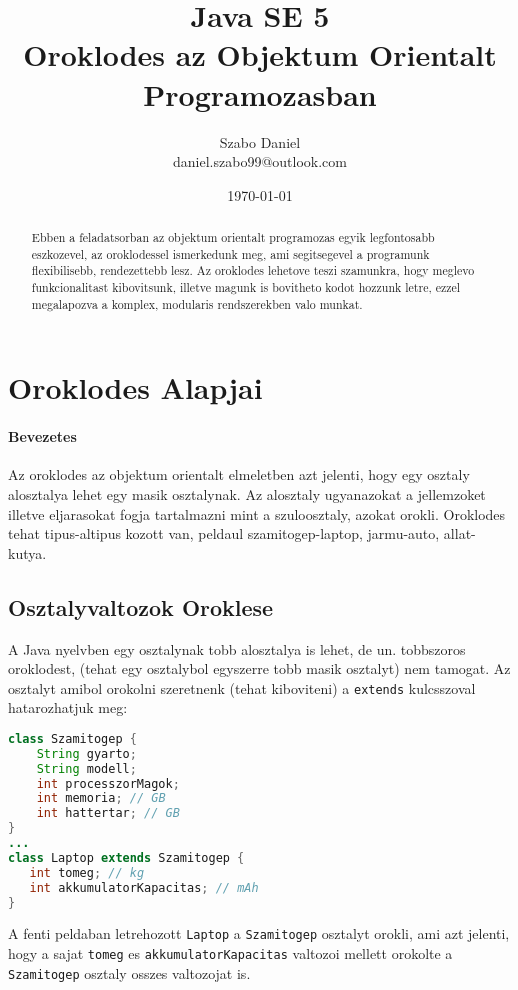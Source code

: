 \documentclass{article}
\title{%
Java SE 5 \\
\large Oroklodes az Objektum Orientalt Programozasban}
\author{Szabo Daniel\\daniel.szabo99@outlook.com}
\date{\today}
\let\l\lstinline
\begin{document}
\maketitle
\begin{abstract}
Ebben a feladatsorban az objektum orientalt programozas egyik legfontosabb eszkozevel, az oroklodessel ismerkedunk meg, ami segitsegevel a programunk flexibilisebb, rendezettebb lesz.
Az oroklodes lehetove teszi szamunkra, hogy meglevo funkcionalitast kibovitsunk, illetve magunk is bovitheto kodot hozzunk letre, ezzel megalapozva a komplex, modularis rendszerekben valo munkat.
\end{abstract}

\newpage

\tableofcontents{}

\newpage

\section{Oroklodes Alapjai}
\paragraph{Bevezetes}

Az oroklodes az objektum orientalt elmeletben azt jelenti, hogy egy osztaly alosztalya lehet egy masik osztalynak. Az alosztaly ugyanazokat a jellemzoket illetve eljarasokat fogja tartalmazni mint a szuloosztaly, azokat orokli. Oroklodes tehat tipus-altipus kozott van, peldaul szamitogep-laptop, jarmu-auto, allat-kutya.

\subsection{Osztalyvaltozok Oroklese}
A Java nyelvben egy osztalynak tobb alosztalya is lehet, de un. tobbszoros oroklodest, (tehat egy osztalybol egyszerre tobb masik osztalyt) nem tamogat. Az osztalyt amibol orokolni szeretnenk (tehat kiboviteni) a \l{extends} kulcsszoval hatarozhatjuk meg:

\begin{lstlisting}[language=Java, caption=A Laptop osztaly kiboviti a Szamitogep osztalyt]
class Szamitogep {
    String gyarto;
    String modell;
    int processzorMagok;
    int memoria; // GB
    int hattertar; // GB
}
...
class Laptop extends Szamitogep {
   int tomeg; // kg
   int akkumulatorKapacitas; // mAh
}
\end{lstlisting}

A fenti peldaban letrehozott \l{Laptop} a \l{Szamitogep} osztalyt orokli, ami azt jelenti, hogy a sajat \l{tomeg} es \l{akkumulatorKapacitas} valtozoi mellett orokolte a \l{Szamitogep} osztaly osszes valtozojat is.
\end{document}
